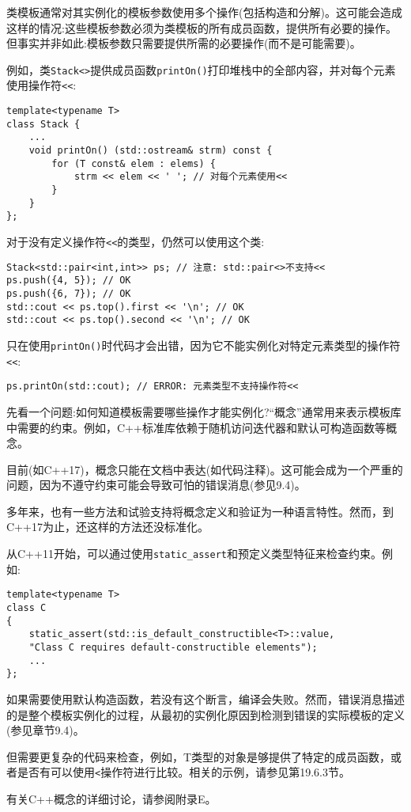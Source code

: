 
类模板通常对其实例化的模板参数使用多个操作(包括构造和分解)。这可能会造成这样的情况:这些模板参数必须为类模板的所有成员函数，提供所有必要的操作。但事实并非如此:模板参数只需要提供所需的必要操作(而不是可能需要)。

例如，类\texttt{Stack<>}提供成员函数\texttt{printOn()}打印堆栈中的全部内容，并对每个元素使用操作符\texttt{<<}:

\begin{lstlisting}[style=styleCXX]
template<typename T>
class Stack {
	...
	void printOn() (std::ostream& strm) const {
		for (T const& elem : elems) {
			strm << elem << ' '; // 对每个元素使用<<
		}
	}
};
\end{lstlisting}

对于没有定义操作符\texttt{<<}的类型，仍然可以使用这个类:

\begin{lstlisting}[style=styleCXX]
Stack<std::pair<int,int>> ps; // 注意: std::pair<>不支持<<
ps.push({4, 5}); // OK
ps.push({6, 7}); // OK
std::cout << ps.top().first << '\n'; // OK
std::cout << ps.top().second << '\n'; // OK
\end{lstlisting}

只在使用\texttt{printOn()}时代码才会出错，因为它不能实例化对特定元素类型的操作符\texttt{<<}:

\begin{lstlisting}[style=styleCXX]
ps.printOn(std::cout); // ERROR: 元素类型不支持操作符<<
\end{lstlisting}


先看一个问题:如何知道模板需要哪些操作才能实例化?“概念”通常用来表示模板库中需要的约束。例如，C++标准库依赖于随机访问迭代器和默认可构造函数等概念。

目前(如C++17)，概念只能在文档中表达(如代码注释)。这可能会成为一个严重的问题，因为不遵守约束可能会导致可怕的错误消息(参见9.4)。

多年来，也有一些方法和试验支持将概念定义和验证为一种语言特性。然而，到C++17为止，还这样的方法还没标准化。

从C++11开始，可以通过使用\texttt{static\_assert}和预定义类型特征来检查约束。例如:

\begin{lstlisting}[style=styleCXX]
template<typename T>
class C
{
	static_assert(std::is_default_constructible<T>::value,
	"Class C requires default-constructible elements");
	...
};
\end{lstlisting}

如果需要使用默认构造函数，若没有这个断言，编译会失败。然而，错误消息描述的是整个模板实例化的过程，从最初的实例化原因到检测到错误的实际模板的定义(参见章节9.4)。

但需要更复杂的代码来检查，例如，T类型的对象是够提供了特定的成员函数，或者是否有可以使用\texttt{<}操作符进行比较。相关的示例，请参见第19.6.3节。

有关C++概念的详细讨论，请参阅附录E。
















